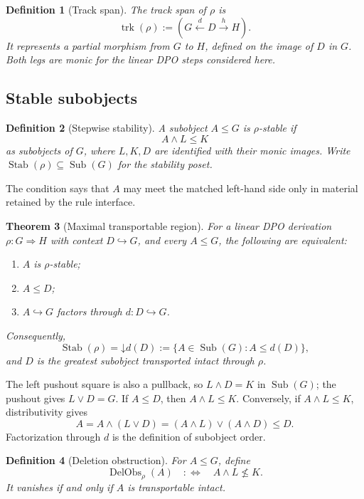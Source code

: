 \documentclass[12pt,a4paper,twoside]{extarticle}
\makeatletter
\theoremstyle{compactplain}
\newtheorem{theorem}{Theorem}[section]
\theoremstyle{compactdef}
\newtheorem{definition}[theorem]{Definition}
\renewenvironment{proof}[1][\proofname]{\par\pushQED{\qed}\normalfont
  \topsep2pt\trivlist\item[\hskip\labelsep\bfseries #1\@addpunct{.}]\ignorespaces}
 {\popQED\endtrivlist\@endpefalse}
\newcommand{\Sub}{\operatorname{Sub}}
\newcommand{\trk}{\operatorname{trk}}
\newcommand{\Stab}{\operatorname{Stab}}
\newcommand{\down}{\mathord{\downarrow}}
\newcommand{\mono}{\hookrightarrow}
\makeatother
\begin{document}
\begin{definition}[Track span]
The track span of $\rho$ is
\[
\trk(\rho):=(G\xleftarrow{d}D\xrightarrow{h}H).
\]
It represents a partial morphism from $G$ to $H$, defined on the image of $D$ in $G$. Both legs are monic for the linear DPO steps considered here.
\end{definition}

\subsection{Stable subobjects}
\begin{definition}[Stepwise stability]
A subobject $A\le G$ is $\rho$-stable if
\[
A\wedge L\le K
\]
as subobjects of $G$, where $L,K,D$ are identified with their monic images. Write $\Stab(\rho)\subseteq\Sub(G)$ for the stability poset.
\end{definition}
The condition says that $A$ may meet the matched left-hand side only in material retained by the rule interface.

\begin{theorem}[Maximal transportable region]\label{thm:maximal-step}
For a linear DPO derivation $\rho:G\Rightarrow H$ with context $D\mono G$, and every $A\le G$, the following are equivalent:
\begin{enumerate}
\item $A$ is $\rho$-stable;
\item $A\le D$;
\item $A\mono G$ factors through $d:D\mono G$.
\end{enumerate}
Consequently,
\[
\Stab(\rho)=\down d(D):=\{A\in\Sub(G):A\le d(D)\},
\]
and $D$ is the greatest subobject transported intact through $\rho$.
\end{theorem}
\begin{proof}
The left pushout square is also a pullback, so $L\wedge D=K$ in $\Sub(G)$; the pushout gives $L\vee D=G$. If $A\le D$, then $A\wedge L\le K$. Conversely, if $A\wedge L\le K$, distributivity gives
\[
A=A\wedge(L\vee D)=(A\wedge L)\vee(A\wedge D)\le D.
\]
Factorization through $d$ is the definition of subobject order.
\end{proof}

\begin{definition}[Deletion obstruction]
For $A\le G$, define
\[
\operatorname{DelObs}_{\rho}(A)\quad:\Longleftrightarrow\quad A\wedge L\nleq K.
\]
It vanishes if and only if $A$ is transportable intact.
\end{definition}
\end{document}
